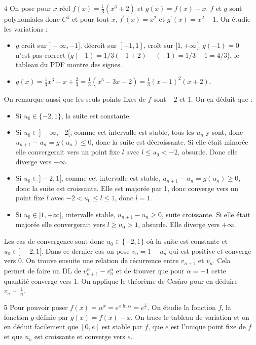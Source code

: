 \begin{correction}{4}
On pose pour $x$ réel $f(x)=\frac{1}{3}(x^{3}+2)$ et $g(x)=f(x)-x$.
$f$ et $g$ sont polynomiales donc $C^{1}$ et pour tout $x$, $f^{\prime}(x)=x^{2}$ et $g^{\prime}(x)=x^{2}-1$.
On étudie les variations :
\begin{itemize}
    \item $g$ croît sur $]-\infty, -1]$, décroît sur $[-1, 1]$, croît sur $[1, +\infty[$. $g(-1) = 0$ n'est pas correct ($g(-1) = 1/3(-1+2) - (-1) = 1/3+1 = 4/3$), le tableau du PDF montre des signes.
    \item $g(x) = \frac{1}{3}x^3 - x + \frac{2}{3} = \frac{1}{3}(x^3 - 3x + 2) = \frac{1}{3}(x-1)^2(x+2)$.\\
\end{itemize}

On remarque aussi que les seuls points fixes de $f$ sont $-2$ et $1$.
On en déduit que :
\begin{itemize}
    \item Si $u_{0}\in\{-2,1\}$, la suite est constante.
    \item Si $u_{0}\in]-\infty,-2[$, comme cet intervalle est stable, tous les $u_{n}$ y sont, donc $u_{n+1}-u_{n}=g(u_{n})\le0$, donc la suite est décroissante. Si elle était minorée elle convergerait vers un point fixe $l$ avec $l\le u_{0}<-2$, absurde. Donc elle diverge vers $-\infty$.
    \item Si $u_{0}\in]-2,1[$, comme cet intervalle est stable, $u_{n+1}-u_{n}=g(u_{n})\ge0$, donc la suite est croissante. Elle est majorée par 1, donc converge vers un point fixe $l$ avec $-2<u_{0}\le l\le1$, donc $l=1$.
    \item Si $u_{0}\in]1,+\infty[$, intervalle stable, $u_{n+1}-u_{n}\ge0$, suite croissante. Si elle était majorée elle convergerait vers $l \ge u_0 > 1$, absurde. Elle diverge vers $+\infty$.
\end{itemize}
Les cas de convergence sont donc $u_{0}\in\{-2,1\}$ où la suite est constante et $u_{0}\in]-2,1[$.
Dans ce dernier cas on pose $v_{n}=1-u_{n}$ qui est positive et converge vers 0.
On trouve ensuite une relation de récurrence entre $v_{n+1}$ et $v_{n}$.
Cela permet de faire un DL de $v_{n+1}^{\alpha}-v_{n}^{\alpha}$ et de trouver que pour $\alpha=-1$ cette quantité converge vers 1.
On applique le théorème de Cesàro pour en déduire $v_{n}\sim\frac{1}{n}$.
\end{correction}

\begin{correction}{5}
Pour pouvoir poser $f(x)=\alpha^{x}=e^{x \ln \alpha}=e^{\frac{x}{e}}$.
On étudie la fonction $f$, la fonction $g$ définie par $g(x)=f(x)-x$.
On trace le tableau de variation et on en déduit facilement que $[0, e]$ est stable par $f$, que $e$ est l'unique point fixe de $f$ et que $u_{n}$ est croissante et converge vers $e$.
\end{correction}


